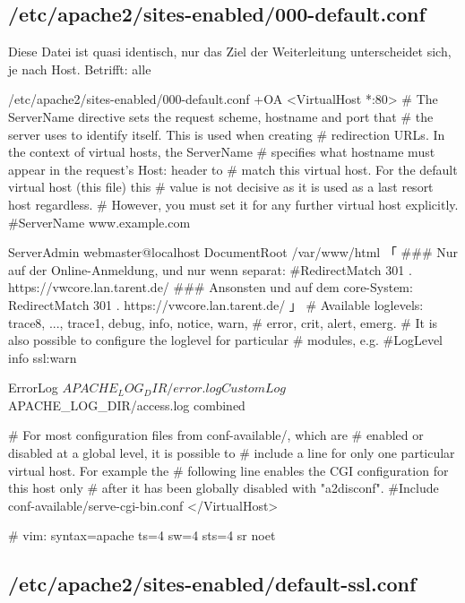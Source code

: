 \ifoa

\subsection{/etc/apache2/sites-enabled/000-default.conf}\label{subsec:refcfg-apache-default}

Diese Datei ist quasi identisch, nur das Ziel der Weiterleitung
unterscheidet sich, je nach Host. Betrifft: alle

\begin{lstdump}[tabsize=2]{/etc/apache2/sites-enabled/000-default.conf +OA}
<VirtualHost *:80>
	# The ServerName directive sets the request scheme, hostname and port that
	# the server uses to identify itself. This is used when creating
	# redirection URLs. In the context of virtual hosts, the ServerName
	# specifies what hostname must appear in the request's Host: header to
	# match this virtual host. For the default virtual host (this file) this
	# value is not decisive as it is used as a last resort host regardless.
	# However, you must set it for any further virtual host explicitly.
	#ServerName www.example.com

	ServerAdmin webmaster@localhost
	DocumentRoot /var/www/html
「
	### Nur auf der Online-Anmeldung, und nur wenn separat:
	#RedirectMatch 301 . https://vwcore.lan.tarent.de/
	### Ansonsten und auf dem core-System:
	RedirectMatch 301 . https://vwcore.lan.tarent.de/
」
	# Available loglevels: trace8, ..., trace1, debug, info, notice, warn,
	# error, crit, alert, emerg.
	# It is also possible to configure the loglevel for particular
	# modules, e.g.
	#LogLevel info ssl:warn

	ErrorLog ${APACHE_LOG_DIR}/error.log
	CustomLog ${APACHE_LOG_DIR}/access.log combined

	# For most configuration files from conf-available/, which are
	# enabled or disabled at a global level, it is possible to
	# include a line for only one particular virtual host. For example the
	# following line enables the CGI configuration for this host only
	# after it has been globally disabled with "a2disconf".
	#Include conf-available/serve-cgi-bin.conf
</VirtualHost>

# vim: syntax=apache ts=4 sw=4 sts=4 sr noet
\end{lstdump}

\subsection{/etc/apache2/sites-enabled/default-ssl.conf}\label{subsec:refcfg-apache-defssl}

